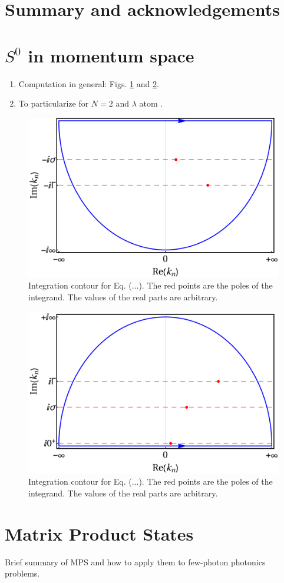 \documentclass[aps,pra,reprint,amsmath,amssymb]{revtex4-1}
\begin{document}
\section{Summary and acknowledgements}

\appendix

\section{$S^0$ in momentum space}

{\color{blue}
\begin{enumerate}
\item Computation in general: Figs. \ref{fig:lower} and \ref{fig:upper}.
\item To particularize for $N=2$ and $\lambda$ atom \cite{Xu2016}.
\end{enumerate}
}

\begin{figure}[tbh!]
\includegraphics[scale=0.25]{lower_contour.pdf}
\caption{Integration contour for Eq. (...). The red points are the poles of the
integrand. The values of the real parts are arbitrary.}
\label{fig:lower}
\end{figure}

\begin{figure}[tbh!]
\includegraphics[scale=0.25]{upper_contour.pdf}
\caption{Integration contour for Eq. (...). The red points are the poles of the
integrand. The values of the real parts are arbitrary.}
\label{fig:upper}
\end{figure}


\section{Matrix Product States}

{\color{blue}
Brief summary of MPS and how to apply them to few-photon photonics problems.}



\end{document}
